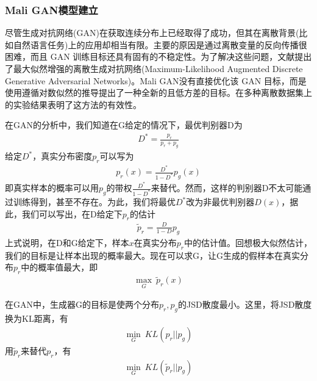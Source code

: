         \subsubsection{Mali GAN模型建立}
            \par
            尽管生成对抗网络(GAN)在获取连续分布上已经取得了成功，但其在离散背景(比如自然语言任务)上的应用却相当有限。主要的原因是通过离散变量的反向传播很困难，而且 GAN 训练目标还具有固有的不稳定性。为了解决这些问题，文献\cite{2017.Tong}提出了最大似然增强的离散生成对抗网络(Maximum-Likelihood Augmented Discrete Generative Adversarial Networks)。Mali GAN没有直接优化该 GAN 目标，而是使用遵循对数似然的推导提出了一种全新的且低方差的目标。在多种离散数据集上的实验结果表明了这方法的有效性。
            \par
            在GAN的分析中，我们知道在G给定的情况下，最优判别器D为
            \begin{align*}
            D^* = \frac{p_r}{p_r+p_g}
            \end{align*}
            给定$D^*$，真实分布密度$p_r$可以写为
            \begin{align*}
            p_r(x) = \frac{D^*}{1-D^*}p_g(x)
            \end{align*}
            即真实样本的概率可以用$p_g$的带权$\frac{D^*}{1-D^*}$来替代。然而，这样的判别器D不太可能通过训练得到，甚至不存在。为此，我们将最优$D^*$改为非最优判别器$D(x)$，据此，我们可以写出，在D给定下$p_r$的估计
            \begin{align*}
            \tilde{p}_r = \frac{D}{1-D}p_g
            \end{align*}
            上式说明，在D和G给定下，样本$x$在真实分布$p_r$中的估计值。回想极大似然估计，我们的目标是让样本出现的概率最大。现在可以求G，让G生成的假样本在真实分布$p_r$中的概率值最大，即
            \begin{align*}
            \max_G\  \tilde{p}_r(x)
            \end{align*}
            \par
            在GAN中，生成器G的目标是使两个分布$p_r,p_g$的JSD散度最小。这里，将JSD散度换为KL距离，有
            \begin{align*}
            \min_G \ KL(p_r||p_g)
            \end{align*}
            用$\tilde{p}_r$来替代$p_r$，有
            \begin{align*}
            \min_G \ KL(\tilde{p}_r||p_g)
            \end{align*}
            \par
